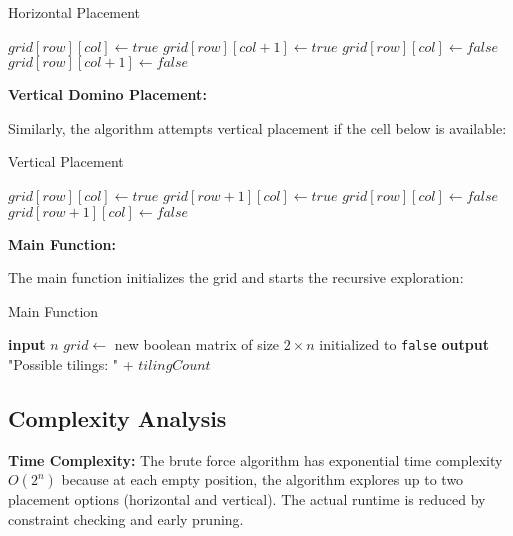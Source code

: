 \documentclass[conference]{IEEEtran}
\begin{document}
\begin{algorithm}[htbp]
\caption{Horizontal Placement}
\begin{algorithmic}[1]
    \State $grid[row][col] \gets true$
    \State $grid[row][col + 1] \gets true$
    \State {}
    \State $grid[row][col] \gets false$ 
    \State $grid[row][col + 1] \gets false$
\EndIf
\end{algorithmic}
\end{algorithm}

\textbf{Vertical Domino Placement:}

Similarly, the algorithm attempts vertical placement if the cell below is available:

\begin{algorithm}[htbp]
\caption{Vertical Placement}
\begin{algorithmic}[1]
    \State $grid[row][col] \gets true$
    \State $grid[row + 1][col] \gets true$
    \State {}
    \State $grid[row][col] \gets false$ 
    \State $grid[row + 1][col] \gets false$
\EndIf
\end{algorithmic}
\end{algorithm}

\textbf{Main Function:}

The main function initializes the grid and starts the recursive exploration:

\begin{algorithm}[htbp]
\caption{Main Function}
\begin{algorithmic}[1]
    \State \textbf{input} $n$ 
    \State $grid \gets$ new boolean matrix of size $2 \times n$ initialized to \texttt{false}
    \State {}
    \State \textbf{output} "Possible tilings: " + $tilingCount$
\EndProcedure
\end{algorithmic}
\end{algorithm}

\subsection{Complexity Analysis}

\textbf{Time Complexity:} The brute force algorithm has exponential time complexity $O(2^n)$ because at each empty position, the algorithm explores up to two placement options (horizontal and vertical). The actual runtime is reduced by constraint checking and early pruning.
\end{document}
